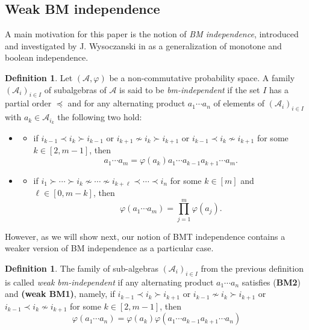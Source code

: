 \documentclass[a4paper,12pt]{extarticle}
\theoremstyle{definition}
\newtheorem{defn}[thm]{Definition}
\theoremstyle{remark}
\def\AA{\mathcal{A}}
\begin{document}
\subsection{Weak BM independence}
%
A main motivation for this paper is the notion of \emph{BM independence}, introduced and investigated by J. Wysoczanski in \cite{BM2007,BM2010} as a generalization of monotone and boolean independence. 
%
\begin{defn}
	
	Let $(\AA,\varphi)$ be a non-commutative probability space. 
	A family $(\mathcal{A}_i)_{i \in I}$  of subalgebras of $\mathcal{A}$ is said to be \emph{bm-independent} if the set $I$ has a partial order $\preceq$ and  for any alternating product $a_1 \cdots a_n$ of elements of  $(\mathcal{A}_i)_{i \in I}$ with $a_k \in \mathcal{A}_{i_k}$ the following two hold:
	\begin{itemize}%
		\item[]  \begin{itemize}
		\item[\textbf{(BM1)}] if  $ i_{k-1} \prec i_k \succ i_{k-1}$ or $ i_{k+1} \nsim i_k \succ i_{k+1}$ or $ i_{k-1} \prec i_k \nsim i_{k+1}$ for some $k \in [2,m-1]$, then 
				\[a_1 \cdots a_m = \varphi(a_k) a_1 \cdots a_{k-1}a_{k+1}\cdots a_m.\] 
		\end{itemize}
		\item[]  \begin{itemize}
		\item[(\textbf{BM2})]  if $i_1\succ \cdots \succ i_k \nsim \cdots \nsim i_{k+\ell}\prec \cdots \prec i_n$ for some $k \in [m]$ and $\ell \in [0,m-k]$, then
				\[ \varphi(a_1 \cdots a_m)  = \prod_{j=1}^m \varphi(a_j). \]
		\end{itemize}
	\end{itemize}
\end{defn}

However, as we will show next, our notion of BMT independence contains a weaker version of BM independence as a particular case. 

\begin{defn} \label{weakBM}
	The family of sub-algebras $(\mathcal{A}_i)_{i \in I}$ from the previous definition is called \emph{weak bm-independent} 
	if any alternating product $a_1 \cdots a_n$ satisfies (\textbf{BM2}) and \textbf{(weak BM1)}, namely, 
	if  $ i_{k-1} \prec i_k \succ i_{k+1}$ or $ i_{k-1} \nsim i_k \succ i_{k+1}$ or $ i_{k-1} \prec i_k \nsim i_{k+1}$ for some $k \in [2,m-1]$, then	
	\[\varphi(a_1 \cdots a_n) = \varphi(a_k) \varphi(a_1 \cdots a_{k-1}a_{k+1}\cdots a_n)\]
\end{defn}
\end{document}
